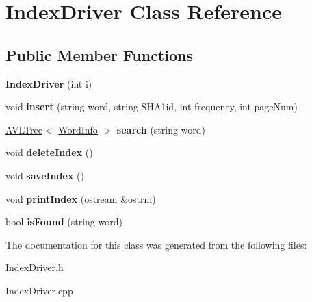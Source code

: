 \hypertarget{class_index_driver}{\section{Index\+Driver Class Reference}
\label{class_index_driver}
}
\subsection*{Public Member Functions}
\begin{DoxyCompactItemize}
\item 
\hypertarget{class_index_driver_aa631f5af96413756245dae4f973e90e5}{{\bfseries Index\+Driver} (int i)}\label{class_index_driver_aa631f5af96413756245dae4f973e90e5}

\item 
\hypertarget{class_index_driver_af4c830a9980676119e2012fd103bcee3}{void {\bfseries insert} (string word, string S\+H\+A1id, int frequency, int page\+Num)}\label{class_index_driver_af4c830a9980676119e2012fd103bcee3}

\item 
\hypertarget{class_index_driver_a79b69c39f0e33d5c08a60febd4910414}{\hyperlink{class_a_v_l_tree}{A\+V\+L\+Tree}$<$ \hyperlink{class_word_info}{Word\+Info} $>$ {\bfseries search} (string word)}\label{class_index_driver_a79b69c39f0e33d5c08a60febd4910414}

\item 
\hypertarget{class_index_driver_adf2ca0497cfc779c933f061c3845b17b}{void {\bfseries delete\+Index} ()}\label{class_index_driver_adf2ca0497cfc779c933f061c3845b17b}

\item 
\hypertarget{class_index_driver_a0adaa7640626144ff046bfa199944a38}{void {\bfseries save\+Index} ()}\label{class_index_driver_a0adaa7640626144ff046bfa199944a38}

\item 
\hypertarget{class_index_driver_a9561b9f913b624e39874754a12a04483}{void {\bfseries print\+Index} (ostream \&ostrm)}\label{class_index_driver_a9561b9f913b624e39874754a12a04483}

\item 
\hypertarget{class_index_driver_a8d5f5174c57f981cc99a8ddf8e7b73dd}{bool {\bfseries is\+Found} (string word)}\label{class_index_driver_a8d5f5174c57f981cc99a8ddf8e7b73dd}

\end{DoxyCompactItemize}


The documentation for this class was generated from the following files\+:\begin{DoxyCompactItemize}
\item 
Index\+Driver.\+h\item 
Index\+Driver.\+cpp\end{DoxyCompactItemize}
